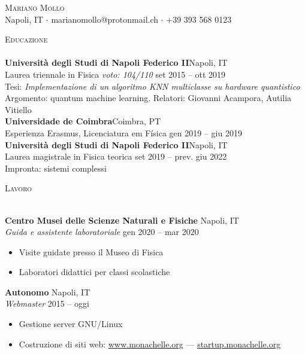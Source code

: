 \documentclass[a4paper]{article}
\newcommand{\lineunder} {
  \vspace*{-8pt} \\
  \hspace*{-18pt} \hrulefill \\
}
\newcommand{\header} [1] {
  {\hspace*{-18pt}\vspace*{6pt} \textsc{#1}}
  \vspace*{-6pt} \lineunder
}
\begin{document}
\vspace*{-40pt}

    

\vspace*{-10pt}
\begin{center}
  {\Huge \scshape {Mariano Mollo}}\\
  Napoli, IT $\cdot$ marianomollo@protonmail.ch $\cdot$ +39 393 568 0123\\
\end{center}

\header{Educazione}
\textbf{Università degli Studi di Napoli Federico II}\hfill Napoli, IT\\
Laurea triennale in Fisica \textit{voto: 104/110} \hfill set 2015 -- ott 2019\\
Tesi: \textit{Implementazione di un algoritmo KNN multiclasse su hardware quantistico}\\
Argomento: quantum machine learning.
Relatori: Giovanni Acampora, Autilia Vitiello\\
\vspace{2mm}
\textbf{Universidade de Coimbra}\hfill Coimbra, PT\\
Esperienza Erasmus, Licenciatura em Física \hfill gen 2019 -- giu 2019\\
\vspace{2mm}
\textbf{Università degli Studi di Napoli Federico II}\hfill Napoli, IT\\
Laurea magistrale in Fisica teorica \hfill set 2019 -- prev. giu 2022\\
Impronta: sistemi complessi
\vspace{2mm}

\header{Lavoro}
\vspace{1mm}

\textbf{Centro Musei delle Scienze Naturali e Fisiche} \hfill Napoli, IT\\
\textit{Guida e assistente laboratoriale} \hfill gen 2020 -- mar 2020\\
\vspace{-1mm}
\begin{itemize} \itemsep 1pt
	\item Visite guidate presso il Museo di Fisica
	\item Laboratori didattici per classi scolastiche
\end{itemize}
\textbf{Autonomo} \hfill Napoli, IT\\
\textit{Webmaster} \hfill 2015 -- oggi\\
\vspace{-1mm}
\begin{itemize} \itemsep 1pt
  \item Gestione server GNU/Linux
  \item Costruzione di siti web:
        \href{https://www.monachelle.org}{www.monachelle.org} ---
        \href{https://startup.monachelle.org}{startup.monachelle.org}
\end{itemize}
\end{document}
